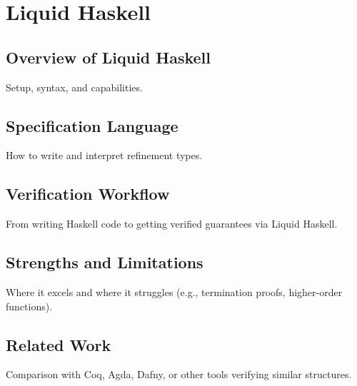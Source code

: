 \chapter { Liquid Haskell }
\section { Overview of Liquid Haskell }
Setup, syntax, and capabilities.

\section { Specification Language }
How to write and interpret refinement types.

\section { Verification Workflow }
From writing Haskell code to getting verified guarantees via Liquid Haskell.

\section { Strengths and Limitations }
Where it excels and where it struggles (e.g., termination proofs, higher-order functions).
\section { Related Work }
Comparison with Coq, Agda, Dafny, or other tools verifying similar structures.
